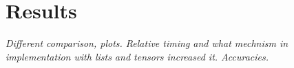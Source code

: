 \section{Results} \label{sec:results}
\textit{Different comparison, plots. Relative timing and what mechnism in implementation with lists and tensors increased it. Accuracies.}